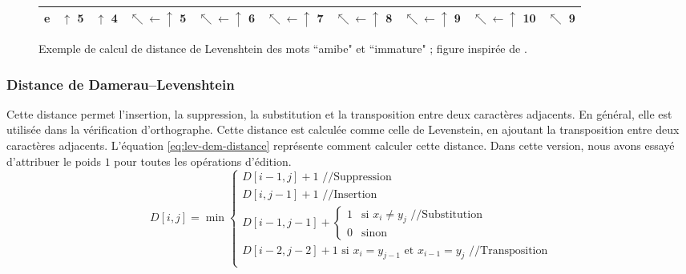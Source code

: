 \documentclass{KodeBook}
\begin{document}
\begin{figure}[ht]
\begin{tabular}{|r|r|r|r|r|r|r|r|r|r|}
		\hline
		\bfseries e & $ \uparrow $ 5 & $ \uparrow $ 4 & $\nwarrow\leftarrow\uparrow $ 5 & $\nwarrow\leftarrow\uparrow $ 6 & $\nwarrow\leftarrow\uparrow $ 7 & $\nwarrow\leftarrow\uparrow $ 8 & $\nwarrow\leftarrow\uparrow $ 9 & $\nwarrow\leftarrow\uparrow $ 10 & \cellcolor{green!25} $\nwarrow $ 9\\
		\hline
	\end{tabular}
	\caption[Exemple de calcul de distance de Levenshtein]{Exemple de calcul de distance de Levenshtein des mots ``amibe"  et ``immature" ; figure inspirée de \cite{2019-jurafsky-martin}.}
	\label{fig:laven-distance}
\end{figure}

\subsubsection{Distance de Damerau–Levenshtein}

Cette distance permet l'insertion, la suppression, la substitution et la transposition entre deux caractères adjacents.
En général, elle est utilisée dans la vérification d'orthographe.
Cette distance est calculée comme celle de Levenstein, en ajoutant la transposition entre deux caractères adjacents.
L'équation \ref{eq:lev-dem-distance} représente comment calculer cette distance.
Dans cette version, nous avons essayé d'attribuer le poids $1$ pour toutes les opérations d'édition.
\begin{equation}
D[i, j] = \min 
	\begin{cases}
		D[i - 1, j] + 1 \text{ //Suppression}\\
		D[i, j-1] + 1 \text{ //Insertion}\\
		D[i-1, j-1] + \begin{cases}
			1 & \text{si } x_i \ne y_j \text{ //Substitution}\\
			0 & \text{sinon}
		\end{cases}\\
		D[i-2, j-2] + 1 \text{ si } x_i = y_{j-1} \text{ et } x_{i-1} = y_j \text{ //Transposition}\\
	\end{cases}
	\label{eq:lev-dem-distance}
\end{equation}
\end{document}
